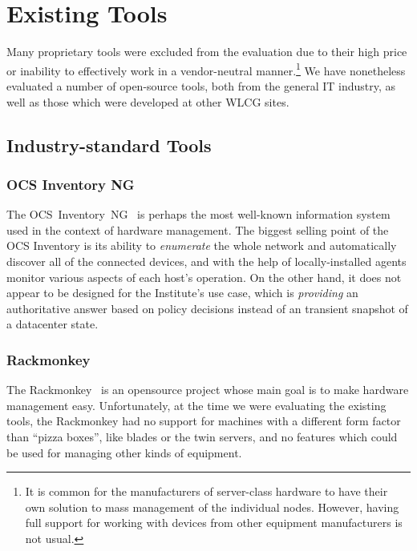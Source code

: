 \documentclass[deska]{subfiles}
\begin{document}
\chapter{Existing Tools}
\label{sec:evaluating-existing-tools}

Many proprietary tools were excluded from the evaluation due to their high price or inability to effectively work in a
vendor-neutral manner.\footnote{It is common for the manufacturers of server-class hardware to have their own solution
to mass management of the individual nodes.  However, having full support for working with devices from other equipment
manufacturers is not usual.}  We have nonetheless evaluated a number of open-source tools, both from the general IT
industry, as well as those which were developed at other WLCG sites.

\section{Industry-standard Tools}

\subsection{OCS Inventory NG}

The OCS~Inventory~NG~\cite{ocs-inventory} is perhaps the most well-known information system used in the context of
hardware management.  The biggest selling point of the OCS Inventory is its ability to {\em enumerate} the whole network
and automatically discover all of the connected devices, and with the help of locally-installed agents monitor various
aspects of each host's operation.  On the other hand, it does not appear to be designed for the Institute's use case,
which is {\em providing} an authoritative answer based on policy decisions instead of an transient snapshot of a
datacenter state.

\subsection{Rackmonkey}

The Rackmonkey~\cite{rackmonkey} is an opensource project whose main goal is to make hardware management easy.
Unfortunately, at the time we were evaluating the existing tools, the Rackmonkey had no support for machines with a
different form factor than ``pizza boxes'', like blades or the twin servers, and no features which could be used for
managing other kinds of equipment.
\end{document}
